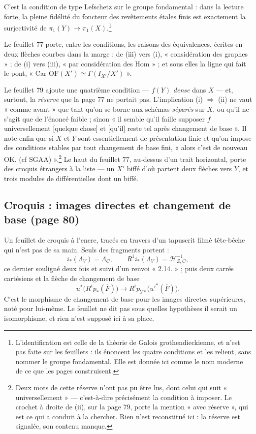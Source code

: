 \documentclass[11pt,a4paper]{article}
\begin{document}
C'est la condition de type Lefschetz sur le groupe fondamental : dans la lecture
forte, la pleine fidélité du foncteur des revêtements étales finis est
exactement la surjectivité de $\pi_{1}(Y) \to
\pi_{1}(X)$.\footnote{L'identification est celle de la théorie de Galois
grothendieckienne, et n'est pas faite sur les feuillets : ils énoncent les
quatre conditions et les relient, sans nommer le groupe fondamental. Elle est
donnée ici comme le nom moderne de ce que les pages construisent.}

Le feuillet 77 porte, entre les conditions, les raisons des équivalences,
écrites en deux flèches courbes dans la marge : de (iii) vers (i), « considération
des graphes » ; de (i) vers (iii), « par considération des Hom » ; et sous elles
la ligne qui fait le pont, « Car $\mathrm{OF}(X') \simeq \Gamma(I_{X'}/X')$ ».

Le feuillet 79 ajoute une quatrième condition — $f(Y)$ \emph{dense} dans $X$ —
et, surtout, la \emph{réserve} que la page 77 ne portait pas. L'implication (i)
$\Rightarrow$ (ii) ne vaut « comme avant » que tant qu'on se borne aux schémas
\emph{séparés} sur $X$, ou qu'il ne s'agit que de l'énoncé faible ; sinon « il
semble qu'il faille supposer $f$ universellement [quelque chose] et [qu'il]
reste tel après changement de base ». Il note enfin que si $X$ et $Y$ sont
essentiellement de présentation finie et qu'on impose des conditions stables par
tout changement de base fini, « alors c'est de nouveau OK. (cf
SGAA) ».\footnote{Deux mots de cette réserve n'ont pas pu être lus, dont celui
qui suit « universellement » — c'est-à-dire précisément la condition à imposer.
Le crochet à droite de (ii), sur la page 79, porte la mention « avec réserve »,
qui est ce qui a conduit à la chercher. Rien n'est reconstitué ici : la réserve
est signalée, son contenu manque.} Le haut du feuillet 77, au-dessus d'un trait
horizontal, porte des croquis étrangers à la liste — un $X'$ biffé d'où partent
deux flèches vers $Y$, et trois modules de différentielles dont un biffé.

\subsection*{Croquis : images directes et changement de base (page 80)}

Un feuillet de croquis à l'encre, tracés en travers d'un tapuscrit filmé
tête-bêche qui n'est pas de sa main. Seuls des fragments portent :
\[
  i_{*}(\Lambda_{V}) = \Lambda_{C} , \qquad
  R^{1} i_{*}(\Lambda_{V}) = \mathcal{H}^{-1}_{Z,C} ,
\]
ce dernier souligné deux fois et suivi d'un renvoi « 2.14. » ; puis deux carrés
cartésiens et la flèche de changement de base
\[
  u^{*}\bigl(R^{i} p_{*}(\overline{F})\bigr) \longrightarrow
  R^{i} p_{Y*}\bigl(u'^{*}(\overline{F})\bigr) .
\]
C'est le morphisme de changement de base pour les images directes supérieures,
noté pour lui-même. Le feuillet ne dit pas sous quelles hypothèses il serait un
isomorphisme, et rien n'est supposé ici à sa place.
\end{document}
